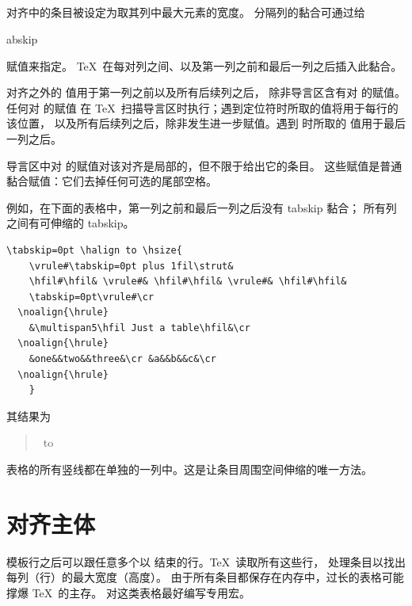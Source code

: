 \documentclass[a4paper]{rapport3}
\makeatletter
\newenvironment{disp}{\begin{quotation}}{\end{quotation}}
\def\cstoidx#1\par{\index{#1@\cs{#1}}}
\def\csidx#1{\cstoidx #1\par\cs{#1}}
\makeatother
\begin{document}
\subsection{}

对齐中的条目被设定为取其列中最大元素的宽度。
分隔列的黏合可通过给 \csidx{tabskip} 赋值来指定。
\altt
\TeX\ 在每对列之间、以及第一列之前和最后一列之后插入此黏合。

对齐之外的  值用于第一列之前以及所有后续列之后，
除非导言区含有对  的赋值。任何对  的赋值
在 \TeX\ 扫描导言区时执行；遇到定位符时所取的值将用于每行的该位置，
以及所有后续列之后，除非发生进一步赋值。遇到  时所取的
 值用于最后一列之后。

导言区中对  的赋值对该对齐是局部的，但不限于给出它的条目。
这些赋值是普通黏合赋值：它们去掉任何可选的尾部空格。

例如，在下面的表格中，第一列之前和最后一列之后没有 tabskip 黏合；
所有列之间有可伸缩的 tabskip。
\begin{verbatim}
\tabskip=0pt \halign to \hsize{
    \vrule#\tabskip=0pt plus 1fil\strut& 
    \hfil#\hfil& \vrule#& \hfil#\hfil& \vrule#& \hfil#\hfil& 
    \tabskip=0pt\vrule#\cr
  \noalign{\hrule}
    &\multispan5\hfil Just a table\hfil&\cr
  \noalign{\hrule}
    &one&&two&&three&\cr &a&&b&&c&\cr
  \noalign{\hrule}
    }
\end{verbatim}
其结果为
\begin{disp}\PopListLevel
\leavevmode{}%
\hbox{ 
 \vbox{\offinterlineskip
\tabskip=0pt \halign to }}\end{disp}
表格的所有竖线都在单独的一列中。这是让条目周围空间伸缩的唯一方法。

\section{对齐主体}

模板行之后可以跟任意多个以  结束的行。\TeX\ 读取所有这些行，
处理条目以找出每列（行）的最大宽度（高度）。
由于所有条目都保存在内存中，过长的表格可能撑爆 \TeX\ 的主存。
对这类表格最好编写专用宏。
\end{document}
